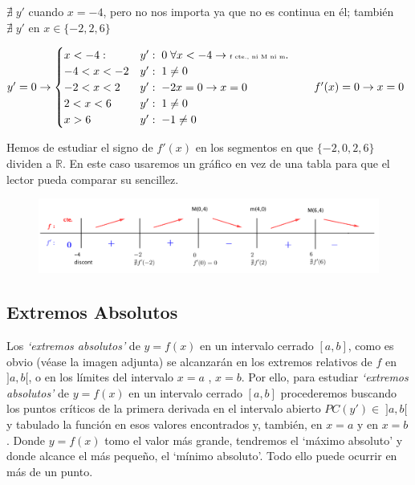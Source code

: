 \begin{ejem}
\begin{itemize}
	$\nexists \; y'$ cuando $x=-4$, pero no nos importa ya que no es continua en él; también  $\nexists \; y'$  en $x \in \{-2, 2 , 6\}$
	
	$y'=0 \to \begin{cases}
	x<-4: & y':\; 0 \;  \forall x<-4 \to \tiny{\mbox{f cte., ni M ni m}} \normalsize{.} \\
	-4<x<-2  & y':\;  1 \neq 0 \\
	-2<x<2 & y':\;  -2x=0 \to x=0 \\
	2<x<6 & y':\;  1 \neq 0 \\
	x>6 & y':\;  -1 \neq 0
 	\end{cases} \qquad f'(x)=0 \to x=0$

	Hemos de estudiar el signo de $f'(x)$ en los segmentos en que $\{-2, 0, 2 , 6\}$ dividen a $\mathbb R$. En este caso usaremos un gráfico en vez de una tabla para que el lector pueda comparar su sencillez.
	
	
	\end{itemize}
	
	
	\begin{figure}[H]
		\centering
		\includegraphics[width=1\textwidth]{imagenes/imagenes05/T05IM09.png}
	\end{figure}
			
	\end{ejem}


	\subsection{Extremos Absolutos}
	
	Los \emph{`extremos absolutos'} de $y=f(x)$ en un intervalo cerrado $[a,b]$, como es obvio (véase la imagen adjunta) se alcanzarán en los extremos relativos de $f$ en $]a,b[$, o en los límites del intervalo $x=a$ , $x=b$. Por ello, para estudiar \emph{`extremos absolutos'} de $y=f(x)$ en un intervalo cerrado $[a,b]$ procederemos buscando los puntos críticos de la primera derivada en el intervalo abierto $PC(y')\in\;  ]a,b[$ y tabulado la función en esos valores encontrados y, también, en $x=a$ y en $x=b$. Donde $y=f(x)$ tomo el valor más grande, tendremos el `máximo absoluto' y donde alcance el más pequeño, el `mínimo absoluto'. Todo ello puede ocurrir en más de un punto.
	
